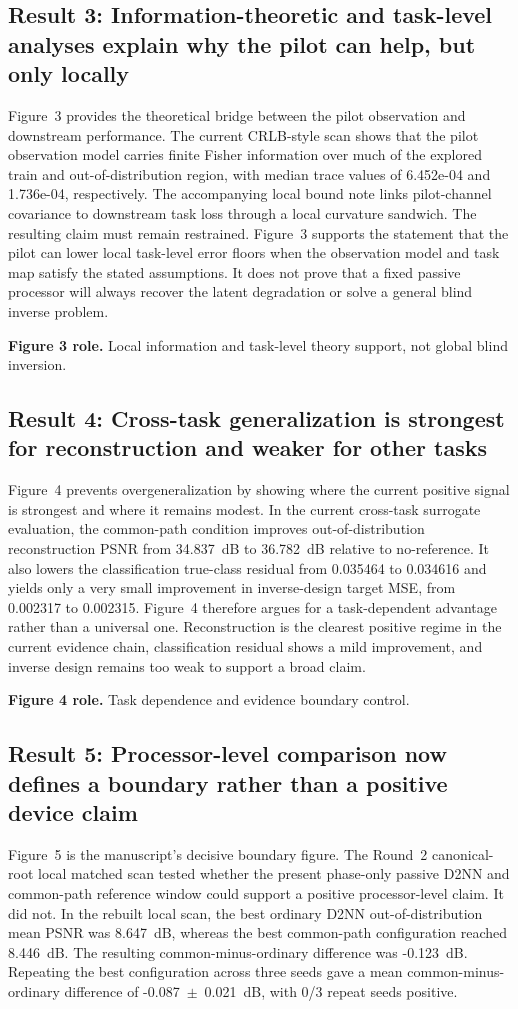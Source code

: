 \documentclass[11pt]{article}
\begin{document}
\subsection{Result 3: Information-theoretic and task-level analyses explain why the pilot can help, but only locally}
Figure~3 provides the theoretical bridge between the pilot observation and downstream performance. The current CRLB-style scan shows that the pilot observation model carries finite Fisher information over much of the explored train and out-of-distribution region, with median trace values of 6.452e-04 and 1.736e-04, respectively. The accompanying local bound note links pilot-channel covariance to downstream task loss through a local curvature sandwich. The resulting claim must remain restrained. Figure~3 supports the statement that the pilot can lower local task-level error floors when the observation model and task map satisfy the stated assumptions. It does not prove that a fixed passive processor will always recover the latent degradation or solve a general blind inverse problem.

\textbf{Figure 3 role.} Local information and task-level theory support, not global blind inversion.

\subsection{Result 4: Cross-task generalization is strongest for reconstruction and weaker for other tasks}
Figure~4 prevents overgeneralization by showing where the current positive signal is strongest and where it remains modest. In the current cross-task surrogate evaluation, the common-path condition improves out-of-distribution reconstruction PSNR from 34.837~dB to 36.782~dB relative to no-reference. It also lowers the classification true-class residual from 0.035464 to 0.034616 and yields only a very small improvement in inverse-design target MSE, from 0.002317 to 0.002315. Figure~4 therefore argues for a task-dependent advantage rather than a universal one. Reconstruction is the clearest positive regime in the current evidence chain, classification residual shows a mild improvement, and inverse design remains too weak to support a broad claim.

\textbf{Figure 4 role.} Task dependence and evidence boundary control.


\subsection{Result 5: Processor-level comparison now defines a boundary rather than a positive device claim}
Figure~5 is the manuscript's decisive boundary figure. The Round~2 canonical-root local matched scan tested whether the present phase-only passive D2NN and common-path reference window could support a positive processor-level claim. It did not. In the rebuilt local scan, the best ordinary D2NN out-of-distribution mean PSNR was 8.647~dB, whereas the best common-path configuration reached 8.446~dB. The resulting common-minus-ordinary difference was -0.123~dB. Repeating the best configuration across three seeds gave a mean common-minus-ordinary difference of -0.087~$\pm$~0.021~dB, with 0/3 repeat seeds positive.
\end{document}
